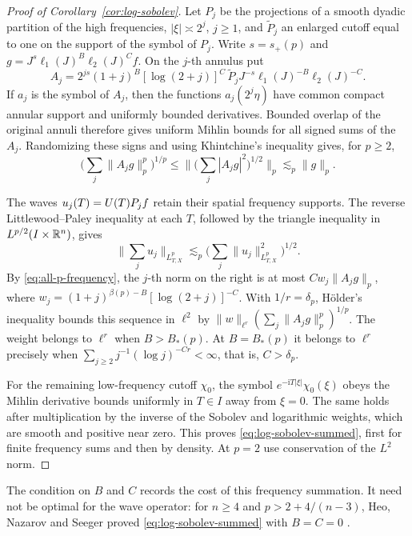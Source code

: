 \begin{proof}[Proof of Corollary~\ref{cor:log-sobolev}]
Let $P_j$ be the projections of a smooth dyadic partition of the high
frequencies, $|\xi|\asymp 2^j$, $j\ge1$, and $\widetilde P_j$ an
enlarged cutoff equal to one on the support of the symbol of $P_j$.
Write $s=s_+(p)$ and
$g=J^s\ell_1(J)^B\ell_2(J)^C f$. On the $j$-th annulus put
\[
 A_j=2^{js}(1+j)^B[\log(2+j)]^C\,
      \widetilde P_j J^{-s}\ell_1(J)^{-B}\ell_2(J)^{-C}.
\]
If $a_j$ is the symbol of $A_j$, then the functions $a_j(2^j\eta)$
have common compact annular support and uniformly bounded derivatives.
Bounded overlap
of the original annuli therefore gives uniform Mihlin bounds for
all signed sums of the $A_j$. Randomizing these signs and using
Khintchine's inequality gives, for $p\ge2$,
\[
 \Big(\sum_j\|A_jg\|_p^p\Big)^{1/p}
 \le \Big\|\Big(\sum_j |A_jg|^2\Big)^{1/2}\Big\|_p
 \lesssim_p \|g\|_p .
\]

The waves $u_j(T)=U(T)P_j f$ retain their spatial frequency supports.
The reverse Littlewood--Paley inequality at each $T$, followed by the
triangle inequality in $L^{p/2}(I\times\mathbb R^n)$, gives
\[
 \Big\|\sum_j u_j\Big\|_{L^p_{T,X}}
 \lesssim_p \Big(\sum_j\|u_j\|_{L^p_{T,X}}^2\Big)^{1/2}.
\]
By \eqref{eq:all-p-frequency}, the $j$-th norm on the right is at most
$C w_j\|A_jg\|_p$, where
$w_j=(1+j)^{\beta(p)-B}[\log(2+j)]^{-C}$.
With $1/r=\delta_p$, H\"older's inequality bounds this sequence in
$\ell^2$ by $\|w\|_{\ell^r}(\sum_j\|A_jg\|_p^p)^{1/p}$. The weight
belongs to $\ell^r$ when $B>B_*(p)$. At $B=B_*(p)$ it belongs to
$\ell^r$ precisely when $\sum_{j\ge2} j^{-1}(\log j)^{-Cr}<\infty$,
that is, $C>\delta_p$.

For the remaining low-frequency cutoff $\chi_0$, the symbol
$e^{-\mathrm iT|\xi|}\chi_0(\xi)$ obeys the Mihlin derivative bounds
uniformly in $T\in I$ away from $\xi=0$. The same holds after
multiplication by the inverse of the Sobolev and logarithmic weights,
which are smooth and positive near zero. This proves
\eqref{eq:log-sobolev-summed}, first for finite frequency sums and
then by density. At $p=2$ use conservation of the $L^2$ norm.
\end{proof}

The condition on $B$ and $C$ records the cost of this frequency
summation. It need not be optimal for the wave operator: for
$n\ge4$ and $p>2+4/(n-3)$, Heo, Nazarov and Seeger proved
\eqref{eq:log-sobolev-summed} with $B=C=0$
\cite[Theorem~1.2]{HeoNazarovSeeger2011}.
